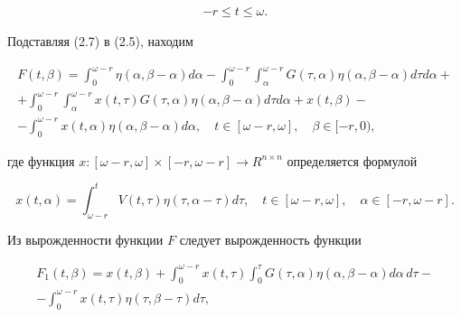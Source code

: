 \begin{pf}
\begin{multline}
-r \leq t \leq \omega.


\end{multline}


Подставляя (2.7) в (2.5), находим


\begin{multline*}


F(t, \beta) = \int_{0}^{\omega-r} \eta(\alpha , \beta-


\alpha) d \alpha- \int_{0}^{\omega-r} \int_{\alpha


}^{\omega-r}G(\tau, \alpha) \eta(\alpha, \beta -


\alpha) d \tau d \alpha+ \\


%


+ \int_{0}^{\omega-r} \int_{\alpha}^{\omega-r}x( t, \tau)


G(\tau, \alpha) \eta(\alpha, \beta - \alpha) d \tau d \alpha+x(t,


\beta)- \\ - \int_{0}^{\omega-r}x(t, \alpha) \eta(\alpha, \beta-


\alpha) d \alpha, \quad t \in[\omega-r, \omega], \quad \beta


\in[-r,0),


\end{multline*}


где функция $x : [\omega-r, \omega]\times [-r, \omega-r]


\rightarrow R^{n \times n}$ определяется формулой


\begin{equation}


x(t, \alpha) = \int_{\omega-r}^{t}V(t, \tau)


\eta(\tau, \alpha- \tau) d \tau, \quad t \in[\omega-r, \omega],


\quad \alpha \in[-r, \omega-r].


\end{equation}


Из вырожденности функции $F$ следует вырожденность функции


\begin{multline}


F_{1}(t, \beta) =x(t, \beta) + \int_{0}^{\omega-r}x(t, \tau)


\int_{0}^{\tau}G(\tau, \alpha) \eta(\alpha, \beta- \alpha) d \alpha\, d


\tau- \\


%


- \int_{0}^{\omega-r}x(t, \tau) \eta(\tau, \beta- \tau) d \tau,



\end{multline}
\end{pf}

